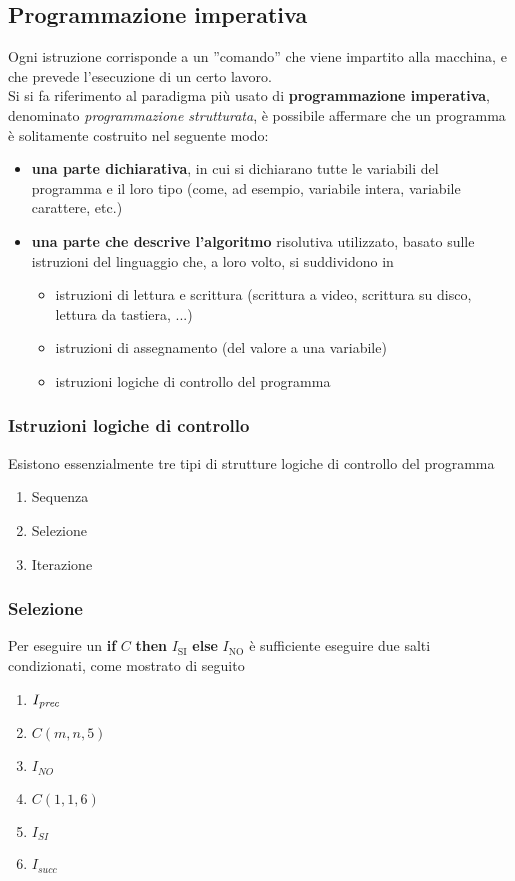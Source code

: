 \documentclass[a4paper]{extarticle}
\newcommand{\quotes}[1]{''#1''}
\begin{document}
\vspace{1em}
\subsection{Programmazione imperativa}
Ogni istruzione corrisponde a un \quotes{comando} che viene impartito alla macchina, e che prevede l'esecuzione di un certo lavoro.\\
Si si fa riferimento al paradigma più usato di \textbf{programmazione imperativa}, denominato \textit{programmazione strutturata}, è possibile affermare che un programma è solitamente costruito nel seguente modo:
\begin{itemize}
    \item \textbf{una parte dichiarativa}, in cui si dichiarano tutte le variabili del programma e il loro tipo (come, ad esempio, variabile intera, variabile carattere, etc.)
    \item \textbf{una parte che descrive l'algoritmo} risolutiva utilizzato, basato sulle istruzioni del linguaggio che, a loro volto, si suddividono in
    \begin{itemize}
        \item istruzioni di lettura e scrittura (scrittura a video, scrittura su disco, lettura da tastiera, ...)
        \item istruzioni di assegnamento (del valore a una variabile)
        \item istruzioni logiche di controllo del programma
    \end{itemize}
\end{itemize}

\vspace{1em}
\noindent
\subsubsection{Istruzioni logiche di controllo}
Esistono essenzialmente tre tipi di strutture logiche di controllo del programma
\begin{enumerate}
    \item Sequenza
    \item Selezione
    \item Iterazione
\end{enumerate}

\vspace{1em}
\subsubsection{Selezione}
Per eseguire un \textbf{if} \(C\) \textbf{then} \(I_{\text{SI}}\) \textbf{else} \(I_{\text{NO}}\) è sufficiente eseguire due salti condizionati, come mostrato di seguito
\begin{enumerate}
    \item \(I_\text{\textit{prec}}\)
    \item \(C(m, n, 5)\)
    \item \(I_{\textit{NO}}\)
    \item \(C(1, 1, 6)\)
    \item \(I_{\textit{SI}}\)
    \item \(I_{\textit{succ}}\)
\end{enumerate}
\end{document}
